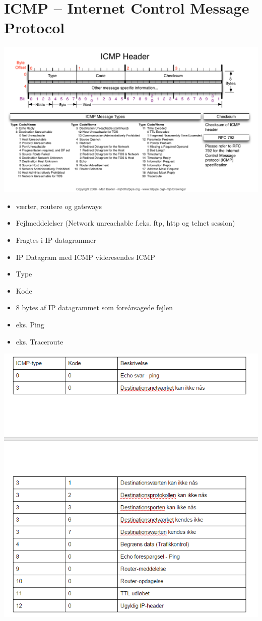{{{{{{{{\section{ICMP – Internet Control Message Protocol}
\begin{center}
  \includegraphics[scale=0.7]{4-network-layer/ICMP-Header.png}
\end{center}
\begin{itemize}
	\item værter, routere og gateways
	\item Fejlmeddelelser (Network unreachable f.eks. ftp, http og telnet session)
	\item Fragtes i IP datagrammer
	\item IP Datagram med ICMP videresendes ICMP
	\item Type
	\item Kode
	\item 8 bytes af IP datagrammet som foreårsagede fejlen
	\item eks. Ping
	\item eks. Traceroute
\end{itemize}
{\includegraphics{4-network-layer/icmp-tabel.png}

}}}}}}}}}
